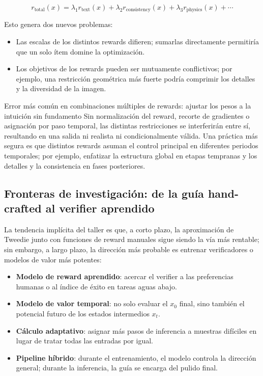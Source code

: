 \documentclass[a4paper]{article}
\begin{document}
$$r_{\text{total}}(x) = \lambda_1 r_{\text{text}}(x) + \lambda_2 r_{\text{consistency}}(x) + \lambda_3 r_{\text{physics}}(x) + \cdots$$

Esto genera dos nuevos problemas:

\begin{itemize}
    \item Las escalas de los distintos rewards difieren; sumarlas directamente permitiría que un solo ítem domine la optimización.
    \item Los objetivos de los rewards pueden ser mutuamente conflictivos; por ejemplo, una restricción geométrica más fuerte podría comprimir los detalles y la diversidad de la imagen.
\end{itemize}

\begin{warningbox}{Error más común en combinaciones múltiples de rewards: ajustar los pesos a la intuición sin fundamento}
Sin normalización del reward, recorte de gradientes o asignación por paso temporal, las distintas restricciones se interferirán entre sí, resultando en una salida ni realista ni condicionalmente válida. Una práctica más segura es que distintos rewards asuman el control principal en diferentes periodos temporales; por ejemplo, enfatizar la estructura global en etapas tempranas y los detalles y la consistencia en fases posteriores.
\end{warningbox}

\subsection{Fronteras de investigación: de la guía hand-crafted al verifier aprendido}

La tendencia implícita del taller es que, a corto plazo, la aproximación de Tweedie junto con funciones de reward manuales sigue siendo la vía más rentable; sin embargo, a largo plazo, la dirección más probable es entrenar verificadores o modelos de valor más potentes:

\begin{itemize}
    \item \textbf{Modelo de reward aprendido}: acercar el verifier a las preferencias humanas o al índice de éxito en tareas aguas abajo.
    \item \textbf{Modelo de valor temporal}: no solo evaluar el $x_0$ final, sino también el potencial futuro de los estados intermedios $x_t$.
    \item \textbf{Cálculo adaptativo}: asignar más pasos de inferencia a muestras difíciles en lugar de tratar todas las entradas por igual.
    \item \textbf{Pipeline híbrido}: durante el entrenamiento, el modelo controla la dirección general; durante la inferencia, la guía se encarga del pulido final.
\end{itemize}
\end{document}
